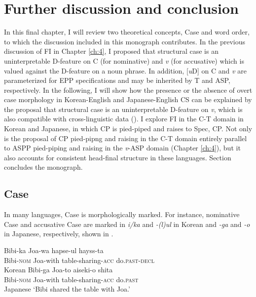 
\chapter{Further discussion and conclusion}\label{ch:6}
\largerpage[-1]
In this final chapter, I will review two theoretical concepts, Case and word order, to which the discussion included in this monograph contributes. In the previous discussion of \ac{FI} in Chapter \ref{ch:4}, I proposed that structural case is an uninterpretable D-feature on C (for nominative) and \textit{v} (for accusative) which is valued against the D-feature on a noun phrase. In addition, [\textit{u}D] on C and \textit{v} are parameterized for \ac{EPP} specifications and may be inherited by T and \ac{ASP}, respectively. In the following, I will show how the presence or the absence of overt case morphology in Korean-English and Japanese-English \ac{CS} can be explained by the proposal that structural case is an uninterpretable D-feature on \textit{v}, which is also compatible with cross-linguistic data (). I explore \ac{FI} in the C-T domain in Korean and Japanese, in which \ac{CP} is pied-piped and raises to Spec, \ac{CP}. Not only is the proposal of \ac{CP} pied-pipng and raising in the C-T domain entirely parallel to \ac{ASP}P pied-piping and raising in the \textit{v}{}-\ac{ASP} domain (Chapter \ref{ch:4}), but it also accounts for consistent head-final structure in these languages. Section  concludes the monograph.

\section{Case}\label{ch6:sect:case} 

In many languages, Case is morphologically marked. For instance, nominative Case and accusative Case are marked in \textit{i/ka} and \textit{{}-(l)ul} in Korean and \textit{{}-ga} and \textit{-o} in Japanese, respectively, shown in .

\begin{exe}\ex\label{ex:142}
\begin{xlist}
    \ex \gll Bibi-ka    Joa-wa   hapse-ul      hayss-ta \\
    Bibi-\textsc{nom} Joa-with table-sharing-\textsc{acc} do\textsc{.past-decl} \\ 
    \hspace*{\fill} Korean
    \ex \gll Bibi-ga    Joa-to     aiseki-o      shita \\
    Bibi-\textsc{nom} Joa-with table-sharing-\textsc{acc} do\textsc{.past} \\
    \hspace*{\fill} Japanese
    \glt ‘Bibi shared the table with Joa.’
\end{xlist}
\end{exe}

